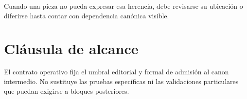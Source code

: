 \begin{observation}
Cuando una pieza no pueda expresar esa herencia, debe revisarse su ubicación o diferirse hasta contar con dependencia canónica visible.
\end{observation}

\section{Cláusula de alcance}
\begin{observation}
El contrato operativo fija el umbral editorial y formal de admisión al canon intermedio. No sustituye las pruebas específicas ni las validaciones particulares que puedan exigirse a bloques posteriores.
\end{observation}



